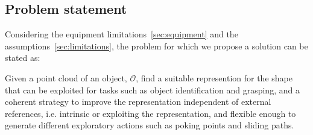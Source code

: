 \subsection{Problem statement}
\label{sec:problem}

Considering the equipment limitations~\ref{sec:equipment} and the assumptions~\ref{sec:limitations}, the problem for which we propose a solution can be stated as:

Given a point cloud of an object, $\mathcal{O}$, find a suitable represention for the shape that can be exploited for tasks such as object identification and grasping, and a coherent strategy to improve the representation independent of external references, i.e. intrinsic or exploiting the representation, and flexible enough to generate different exploratory actions such as poking points and sliding paths.
